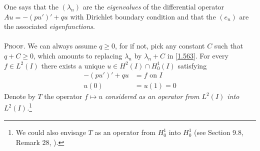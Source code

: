 \documentclass[a4paper,oneside]{article}
\numberwithin{equation}{section}
\begin{document}
One says that the $\left(\lambda _n\right)$ are the \textit{eigenvalues} of the differential operator $Au=-\left(pu'\right)'+qu$ with Dirichlet boundary condition and that the $\left(e_n\right)$ are the associated \textit{eigenfunctions}.\\
\\
\textsc{Proof.} We can always assume $q\ge 0$, for if not, pick any constant $C$ such that $q+C\ge 0$, which amounts to replacing $\lambda _n$ by $\lambda _n+C$ in \eqref{1.563}. For every $f\in L^2\left(I\right)$ there exists a unique $u \in {H^2}\left( I \right) \cap H_0^1\left( I \right)$ satisfying
\begin{align}
\label{1.565}
 - \left( {pu'} \right)' + qu &= f\mbox{ on } I\\
u\left( 0 \right) &= u\left( 1 \right) = 0 \label{1.566}
\end{align}
Denote by $T$ the operator $f\mapsto u$ \textit{considered as an operator from $L^2\left(I\right)$ into $L^2\left(I\right)$.}\footnote{We could also envisage $T$ as an operator from $H_0^1$ into $H_0^1$ (see Section 9.8, Remark 28, \cite{1}).}
\end{document}
